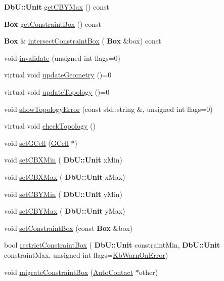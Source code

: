 \begin{DoxyCompactItemize}
\textbf{ Db\+U\+::\+Unit} \mbox{\hyperlink{classKatabatic_1_1AutoContact_a4e4061a17285b0c08c31cfee65947cb6}{get\+C\+B\+Y\+Max}} () const
\item 
\textbf{ Box} \mbox{\hyperlink{classKatabatic_1_1AutoContact_ae9d087a6cd3d459d7f4bea6bc8b08b49}{get\+Constraint\+Box}} () const
\item 
\textbf{ Box} \& \mbox{\hyperlink{classKatabatic_1_1AutoContact_ac2fe070a286356a24baa466b4fe5b74d}{intersect\+Constraint\+Box}} (\textbf{ Box} \&box) const
\item 
void \mbox{\hyperlink{classKatabatic_1_1AutoContact_aabac50fd9b8e1bba7289573973658d18}{invalidate}} (unsigned int flags=0)
\item 
virtual void \mbox{\hyperlink{classKatabatic_1_1AutoContact_af6a2454547eeb7f5a519970dcb467e90}{update\+Geometry}} ()=0
\item 
virtual void \mbox{\hyperlink{classKatabatic_1_1AutoContact_a690764ddc997fe9766a79c4b8e0c3e2f}{update\+Topology}} ()=0
\item 
void \mbox{\hyperlink{classKatabatic_1_1AutoContact_a66f92d8233776fb858075f78af451997}{show\+Topology\+Error}} (const std\+::string \&, unsigned int flags=0)
\item 
virtual void \mbox{\hyperlink{classKatabatic_1_1AutoContact_ac371cd5b837a8965c11297c197e70a45}{check\+Topology}} ()
\item 
void \mbox{\hyperlink{classKatabatic_1_1AutoContact_aa1a02e206437f1371a74cafc724b00d7}{set\+G\+Cell}} (\mbox{\hyperlink{classKatabatic_1_1GCell}{G\+Cell}} $\ast$)
\item 
void \mbox{\hyperlink{classKatabatic_1_1AutoContact_a9fcb986110e79bc0044f7bfe503acc0c}{set\+C\+B\+X\+Min}} (\textbf{ Db\+U\+::\+Unit} x\+Min)
\item 
void \mbox{\hyperlink{classKatabatic_1_1AutoContact_aaa7652f5db46cab9edb066d06ea979f9}{set\+C\+B\+X\+Max}} (\textbf{ Db\+U\+::\+Unit} x\+Max)
\item 
void \mbox{\hyperlink{classKatabatic_1_1AutoContact_a5b598929b39ad3ec202405b31ac02b1d}{set\+C\+B\+Y\+Min}} (\textbf{ Db\+U\+::\+Unit} y\+Min)
\item 
void \mbox{\hyperlink{classKatabatic_1_1AutoContact_a1fdb3737d910a966e150a86d885f3c05}{set\+C\+B\+Y\+Max}} (\textbf{ Db\+U\+::\+Unit} y\+Max)
\item 
void \mbox{\hyperlink{classKatabatic_1_1AutoContact_a5e5f791613d0ef8f4cf9e7d8f35dc4c5}{set\+Constraint\+Box}} (const \textbf{ Box} \&box)
\item 
bool \mbox{\hyperlink{classKatabatic_1_1AutoContact_ac893802d1c5518cab86f8341af817abe}{restrict\+Constraint\+Box}} (\textbf{ Db\+U\+::\+Unit} constraint\+Min, \textbf{ Db\+U\+::\+Unit} constraint\+Max, unsigned int flags=\mbox{\hyperlink{namespaceKatabatic_a2af2ad6b6441614038caf59d04b3b217aa5153b2cc25ebccca8616ce20ecd727a}{Kb\+Warn\+On\+Error}})
\item 
void \mbox{\hyperlink{classKatabatic_1_1AutoContact_a7fc4029992d75a62ce718e5e622f8ce9}{migrate\+Constraint\+Box}} (\mbox{\hyperlink{classKatabatic_1_1AutoContact}{Auto\+Contact}} $\ast$other)
\end{DoxyCompactItemize}

